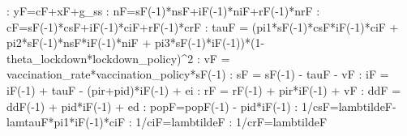 \documentclass{article}%
\begin{document}
   :  yF=cF+xF+g\_ss\newline%
   :  nF=sF({-}1)*nsF+iF({-}1)*niF+rF({-}1)*nrF\newline%
   :  cF=sF({-}1)*csF+iF({-}1)*ciF+rF({-}1)*crF\newline%
   :  tauF = (pi1*sF({-}1)*csF*iF({-}1)*ciF + pi2*sF({-}1)*nsF*iF({-}1)*niF + pi3*sF({-}1)*iF({-}1))*(1{-}theta\_lockdown*lockdown\_policy)\^{}2\newline%
   :  vF = vaccination\_rate*vaccination\_policy*sF({-}1)\newline%
   :  sF = sF({-}1) {-} tauF {-} vF\newline%
   :  iF = iF({-}1) + tauF {-} (pir+pid)*iF({-}1) + ei\newline%
   :  rF = rF({-}1) + pir*iF({-}1) + vF\newline%
   :  ddF = ddF({-}1) + pid*iF({-}1) + ed\newline%
   :  popF=popF({-}1) {-} pid*iF({-}1)\newline%
   :  1/csF=lambtildeF{-}lamtauF*pi1*iF({-}1)*ciF\newline%
   :  1/ciF=lambtildeF\newline%
   :  1/crF=lambtildeF\newline%
\end{document}
